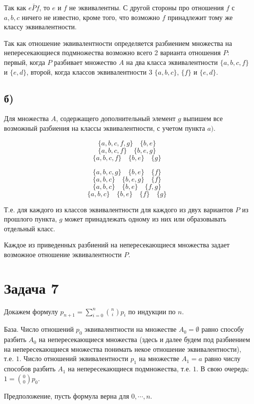 \documentclass{article}
\begin{document}
	Так как $e \bar{P} f$, то $e$ и $f$ не эквивалентны. С другой стороны про отношения $f$ с $a, b, c$ ничего не известно, кроме того, что возможно $f$ принадлежит тому же классу эквивалентности.
	
	Так как отношение эквивалентности определяется разбиением множества на непересекающиеся подмножества возможно всего 2 варианта отношения $P$: первый, когда $P$ разбивает множество $A$ на два класса эквивалентности $\{a, b, c, f\}$ и $\{e, d\}$, второй, когда классов эквивалентности 3 $\{a, b, c\}$, $\{f\}$ и $\{e, d\}$.
	
	\subsection {б)}
	
	Для множества $A$, содержащего дополнительный элемент $g$ выпишем все возможный разбиения на классы эквивалентности, с учетом пункта $a)$.
	
	$$\{a, b, c, f, g\} \quad \{b, e\}$$
	$$\{a, b, c, f\} \quad \{b, e, g\}$$
	$$\{a, b, c, f\} \quad \{b, e\} \quad \{g\}$$
	
	$$\{a, b, c, g\} \quad \{b, e\} \quad \{f\}$$
	$$\{a, b, c\} \quad \{b, e, g\} \quad \{f\}$$
	$$\{a, b, c\} \quad \{b, e\} \quad \{f, g\}$$
	$$\{a, b, c\} \quad \{b, e\} \quad \{f\} \quad \{g\}$$
	
	Т.е. для каждого из классов эквивалентности для каждого из двух вариантов $P$ из прошлого пункта, $g$ может принадлежать одному из них или образовывать отдельный класс.
	
	Каждое из приведенных разбиений на непересекающиеся множества задает возможное отношение эквивалентности $P$.
	
	\section{Задача 7}
	
	Докажем формулу $p_{n+1} = \sum_{i=0}^{n} {n \choose i} p_i$ по индукции по $n$.
	
	База. Число отношений $p_0$ эквивалентности на множестве $A_0 = \emptyset$ равно способу разбить $A_0$ на непересекающиеся множества (здесь и далее будем под разбиением на непересекающиеся множества понимать некое отношение эквивалентности), т.е. $1$. Число отношений эквивалентности $p_1$ на множестве $A_1 = {a}$ равно числу способов разбить $A_1$ на непересекающиеся подмножества, т.е. $1$. В свою очередь: $1 = {0 \choose 0} p_0$.
	
	Предположение, пусть формула верна для ${0, \cdots, n}$.
	
\end{document}
